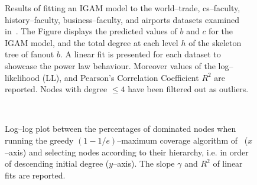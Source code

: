 \documentclass[11pt]{article}
\begin{document}
	\begin{figure}
    \begin{center}
    \caption{Results of fitting an IGAM model to the world--trade, cs--faculty, history--faculty, business--faculty, and airports datasets examined in~\cite{elliott2020core, de2018exploratory, clauset2015systematic, colizza2007reaction, adamic2005political}. The Figure displays the predicted values of $b$ and $c$ for the IGAM model, and the total degree at each level $h$ of the skeleton tree of fanout $b$. A linear fit is presented for each dataset to showcase the power law behaviour. Moreover values of the log--likelihood (LL), and Pearson's Correlation Coefficient $R^2$ are reported. Nodes with degree $\le 4$ have been filtered out as outliers.}
    \end{center}
    \end{figure}
    { \hspace*{\fill} \\}
    
    \begin{figure}
    \begin{center}
    \caption{Log--log plot between the percentages of dominated nodes when running the greedy $(1 - 1 / e)$--maximum coverage algorithm of~\cite{nemhauser1978analysis} ($x$--axis) and selecting nodes according to their hierarchy, i.e. in order of descending initial degree ($y$--axis). The slope $\gamma$ and $R^2$  of linear fits are reported.}
    \end{center}
    \end{figure}
    { \hspace*{\fill} \\}
    
\end{document}
